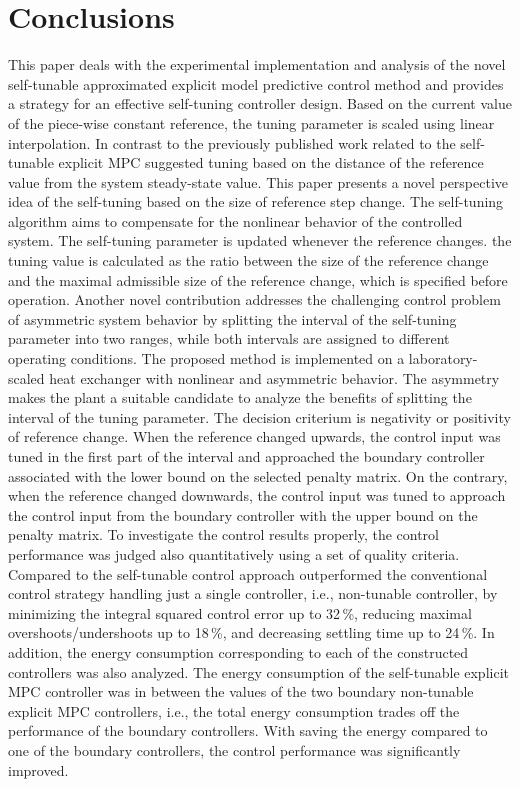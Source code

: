 \documentclass[preprint,12pt]{elsarticle}
\begin{document}
	\section{Conclusions}
	\label{sec:conclusion}
	
	This paper deals with the experimental implementation and analysis of the novel self-tunable approximated explicit model predictive control method and provides a strategy for an effective self-tuning controller design. Based on the current value of the piece-wise constant reference, the tuning parameter is scaled using linear interpolation. 
	In contrast to the previously published work related to the self-tunable explicit MPC suggested tuning based on the distance of the reference value from the system steady-state value. This paper presents a novel perspective idea of the self-tuning based on the size of reference step change. The self-tuning algorithm aims to compensate for the nonlinear behavior of the controlled system. The self-tuning parameter is updated whenever the reference changes. the tuning value is calculated as the ratio between the size of the reference change and the maximal admissible size of the reference change, which is specified before operation. 
	Another novel contribution addresses the challenging control problem of asymmetric system behavior by splitting the interval of the self-tuning parameter into two ranges, while both intervals are assigned to different operating conditions. The proposed method is implemented on a laboratory-scaled heat exchanger with nonlinear and asymmetric behavior. The asymmetry makes the plant a suitable candidate to analyze the benefits of splitting the interval of the tuning parameter. The decision criterium is negativity or positivity of reference change. When the reference changed upwards, the control input was tuned in the first part of the interval and approached the boundary controller associated with the lower bound on the selected penalty matrix. On the contrary, when the reference changed downwards, the control input was tuned to approach the control input from the boundary controller with the upper bound on the penalty matrix. To investigate the control results properly, the control performance was judged also quantitatively using a set of quality criteria. Compared to the self-tunable control approach outperformed the conventional control strategy handling just a single controller, i.e., non-tunable controller, by minimizing the integral squared control error up to 32\,\%, reducing maximal overshoots/undershoots up to 18\,\%, and decreasing settling time up to 24\,\%. In addition, the energy consumption corresponding to each of the constructed controllers was also analyzed. The energy consumption of the self-tunable explicit MPC controller was in between the values of the two boundary non-tunable explicit MPC controllers, i.e., the total energy consumption trades off the performance of the boundary controllers. %
	With saving the energy compared to one of the boundary controllers, the control performance was significantly improved.  
	
\end{document}
